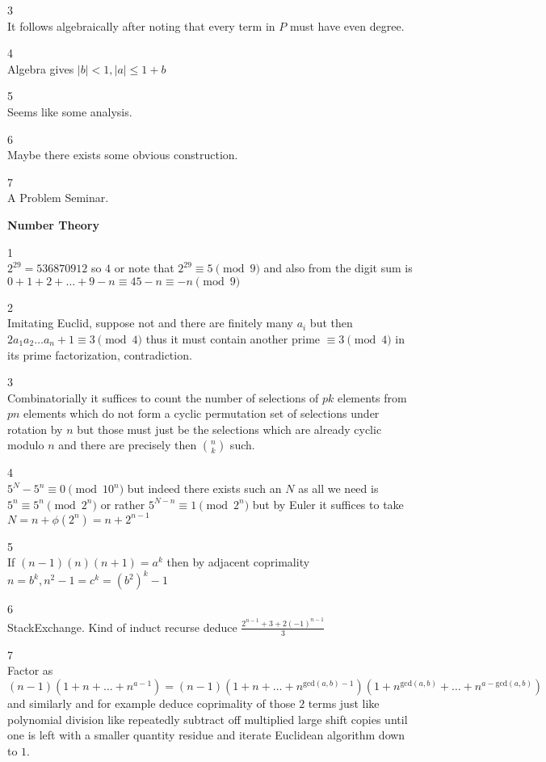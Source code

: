3 \\
It follows algebraically after noting that every term in $P$ must have even degree.

4 \\
Algebra gives $|b|<1,|a|\le 1+b$

5 \\
Seems like some analysis.

6 \\
Maybe there exists some obvious construction.

7 \\
A Problem Seminar.

\newpage

\textbf{Number Theory}

1 \\
$2^{29}=536870912$ so $\boxed{4}$ or note that $2^{29} \equiv 5 \pmod{9}$ and also from the digit sum is $0+1+2+\dots+9-n \equiv 45-n \equiv -n \pmod{9}$

2 \\
Imitating Euclid, suppose not and there are finitely many $a_i$ but then $2a_1a_2\dots a_n+1 \equiv 3 \pmod{4}$ thus it must contain another prime $\equiv 3 \pmod{4}$ in its prime factorization, contradiction.

3 \\
Combinatorially it suffices to count the number of selections of $pk$ elements from $pn$ elements which do not form a cyclic permutation set of selections under rotation by $n$ but those must just be the selections which are already cyclic modulo $n$ and there are precisely then $\binom{n}{k}$ such.

4 \\
$5^N-5^n \equiv 0 \pmod{10^n}$ but indeed there exists such an $N$ as all we need is $5^n \equiv 5^n \pmod{2^n}$ or rather $5^{N-n} \equiv 1 \pmod{2^n}$ but by Euler it suffices to take $N=n+\phi(2^n)=n+2^{n-1}$

5 \\
If $(n-1)(n)(n+1)=a^k$ then by adjacent coprimality $n=b^k,n^2-1=c^k=(b^2)^k-1$

6 \\
StackExchange. Kind of induct recurse deduce $\boxed{\frac{2^{n-1}+3+2(-1)^{n-1}}{3}}$

7 \\
Factor as $(n-1)(1+n+\dots+n^{a-1})=(n-1)(1+n+\dots+n^{\text{gcd}(a,b)-1})(1+n^{\text{gcd}(a,b)}+\dots+n^{a-\text{gcd}(a,b)})$ and similarly and for example deduce coprimality of those $2$ terms just like polynomial division like repeatedly subtract off multiplied large shift copies until one is left with a smaller quantity residue and iterate Euclidean algorithm down to $1$.

